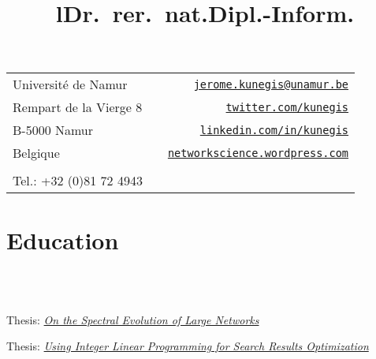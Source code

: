 \documentclass[line,margin]{res}
\newcounter{x}
\begin{document}
\begin{resume}

\vspace{0.5cm}

\hspace{-3cm}
\begin{tabular}{lcr}
  Université de Namur    &\hspace{6.3cm}\hfill& {\tt \href{mailto:jerome.kunegis@unamur.be}{jerome.kunegis@unamur.be}} \\
  Rempart de la Vierge 8 &                    & {\tt \href{http://twitter.com/kunegis}{twitter.com/kunegis}} \\
  B-5000 Namur           &                    & {\tt \href{http://www.linkedin.com/in/kunegis}{linkedin.com/in/kunegis}} \\
  Belgique               &                    & {\tt \href{http://networkscience.wordpress.com/}{networkscience.wordpress.com}} \\
  & & \\
  Tel.:  +32 (0)81 72 4943
\end{tabular}
\vspace{1cm}

\section{Education}

\begin{format}
\title{l}\\
\\
\end{format}

\title{\bf Dr.\ rer.\ nat.}
\begin{position}
Thesis:
\emph{\href{https://kola.opus.hbz-nrw.de/frontdoor/index/index/docId/581}{On
    the Spectral Evolution of Large Networks}}  
\end{position}

\title{\bf Dipl.-Inform.}
\begin{position}
Thesis: \emph{\href{https://pdfs.semanticscholar.org/42ca/e9b00864ee09bc9bc92ef3d411e20b966a8d.pdf}{Using Integer Linear Programming for Search Results Optimization}}
\end{position}


\end{resume}
\end{document}

